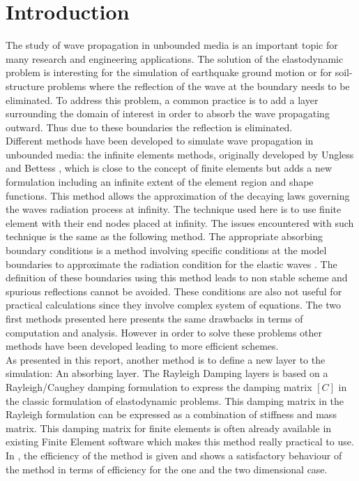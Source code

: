 
\pagestyle{plain}
\setcounter{page}{1}
\section*{Introduction}
The study of wave propagation in unbounded media is an important topic for many research and engineering applications. The solution of the elastodynamic problem is interesting for the simulation of earthquake ground motion or for soil-structure problems where the reflection of the wave at the boundary needs to be eliminated. To address this problem, a common practice is to add a layer surrounding the domain of interest in order to absorb the wave propagating outward. Thus due to these boundaries the reflection is eliminated.  \\
Different methods have been developed to simulate wave propagation in unbounded media: the infinite elements methods, originally developed by Ungless \cite{Ungless} and Bettess \cite{Bettess}, which is close to the concept of finite elements but adds a new formulation including an infinite extent of the element region and shape functions. This method allows the approximation of the decaying laws governing the waves radiation process at infinity. The technique used here is to use finite element with their end nodes placed at infinity. The issues encountered with such technique is the same as the following method.  The appropriate absorbing boundary conditions is a method involving specific conditions at the model boundaries to approximate the radiation condition for the elastic waves \cite{Engquist}. The definition of these boundaries using this method leads to non stable scheme and spurious reflections cannot be avoided. These conditions are also not useful for practical calculations since they involve complex system of equations. The two first methods presented here presents the same drawbacks in terms of computation and analysis. However in order to solve these problems other methods have been developed leading to more efficient schemes.\\ 
As presented in this report, another method is to define a new layer to the simulation: An absorbing layer. The Rayleigh Damping layers is based on a Rayleigh/Caughey damping formulation to express the damping matrix $[C]$ in the classic formulation of elastodynamic problems. This damping matrix in the Rayleigh formulation can be expressed as a combination of stiffness and mass matrix. This damping matrix for finite elements is often already available in existing Finite Element software which makes this method really practical to use. In \cite{Semblat}, the efficiency of the method is given and shows a satisfactory behaviour of the method in terms of efficiency for the one and the two dimensional case. \\
